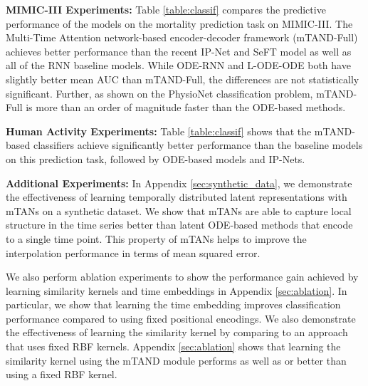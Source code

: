 \textbf{MIMIC-III Experiments:}
Table \ref{table:classif} compares the  predictive performance of the models on the mortality prediction task on MIMIC-III.  The Multi-Time Attention network-based encoder-decoder framework (mTAND-Full) achieves better performance than the recent IP-Net and SeFT model as well as all of the RNN baseline models. While 
ODE-RNN and L-ODE-ODE both have slightly better mean AUC than mTAND-Full, the differences are not statistically significant. Further, as shown on the PhysioNet classification problem, mTAND-Full is more than an order of magnitude faster than the ODE-based methods.

\textbf{Human Activity Experiments:}
Table \ref{table:classif} shows that the mTAND-based classifiers achieve significantly better performance than the baseline models on this prediction task, followed by ODE-based models and IP-Nets. 

\textbf{Additional Experiments:} In Appendix \ref{sec:synthetic_data}, we demonstrate the effectiveness of learning  temporally distributed latent representations with mTANs on a synthetic dataset. We show that mTANs are able to capture local structure in the time series better than latent ODE-based methods that encode to a single time point. This property of mTANs helps to improve the interpolation performance in terms of mean squared error.

We also perform ablation experiments to show the performance gain achieved by learning similarity kernels and time embeddings in Appendix \ref{sec:ablation}. In particular, we show that learning the time embedding improves classification performance compared to using fixed positional encodings. We also demonstrate the effectiveness of learning the similarity kernel by comparing to an approach that uses fixed RBF kernels. Appendix \ref{sec:ablation} shows that  learning the similarity kernel using the mTAND module performs as well as or better than using a fixed RBF kernel.
